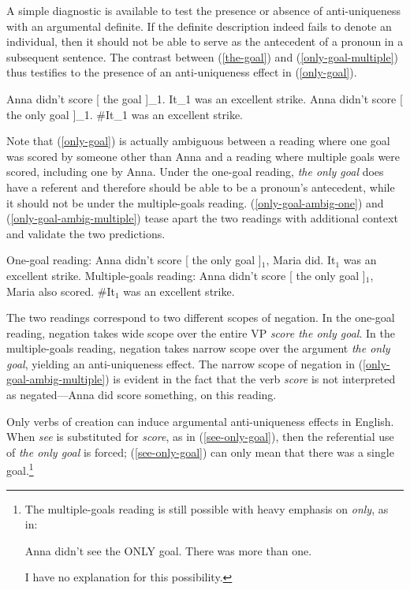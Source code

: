\documentclass{article}
\begin{document}
A simple diagnostic is available to test the presence or absence of anti-uniqueness with an argumental definite. If the definite description indeed fails to denote an individual, then it should not be able to serve as the antecedent of a pronoun in a subsequent sentence. The contrast between (\ref{the-goal}) and (\ref{only-goal-multiple}) thus testifies to the presence of an anti-uniqueness effect in (\ref{only-goal}).

\begin{exe}
	\ex \label{the-goal} Anna didn't score [ the goal ]_1. It_1 was an excellent strike.
	\ex \label{only-goal-multiple} Anna didn't score [ the only goal ]_1. \#It_1 was an excellent strike.
\end{exe}

Note that (\ref{only-goal}) is actually ambiguous between a reading where one goal was scored by someone other than Anna and a reading where multiple goals were scored, including one by Anna. Under the one-goal reading, \textit{the only goal} does have a referent and therefore should be able to be a pronoun's antecedent, while it should not be under the multiple-goals reading. (\ref{only-goal-ambig-one}) and (\ref{only-goal-ambig-multiple}) tease apart the two readings with additional context and validate the two predictions.

\begin{exe}
	\ex \label{only-goal-ambig-one} One-goal reading: Anna didn't score [ the only goal ]$_1$, Maria did. It$_1$ was an excellent strike.
	\ex \label{only-goal-ambig-multiple} Multiple-goals reading: Anna didn't score [ the only goal ]$_1$, Maria also scored. \#It$_1$ was an excellent strike.
\end{exe}

The two readings correspond to two different scopes of negation. In the one-goal reading, negation takes wide scope over the entire VP \textit{score the only goal}. In the multiple-goals reading, negation takes narrow scope over the argument \textit{the only goal}, yielding an anti-uniqueness effect. The narrow scope of negation in (\ref{only-goal-ambig-multiple}) is evident in the fact that the verb \textit{score} is not interpreted as negated---Anna did score something, on this reading.

Only verbs of creation can induce argumental anti-uniqueness effects in English. When \textit{see} is substituted for \textit{score}, as in (\ref{see-only-goal}), then the referential use of \textit{the only goal} is forced; (\ref{see-only-goal}) can only mean that there was a single goal.\footnote{The multiple-goals reading is still possible with heavy emphasis on \textit{only}, as in: \begin{exe} \ex Anna didn't see the ONLY goal. There was more than one. \end{exe} I have no explanation for this possibility.}
\end{document}
